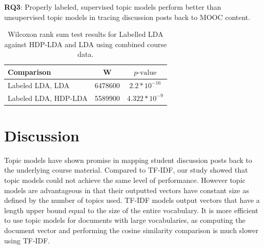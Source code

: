 \documentclass[sigconf, anonymous]{acmart}
\begin{document}
\begin{tcolorbox}[sharp corners, top=1mm, bottom=1mm]
\textbf{RQ3}: Properly labeled, supervised topic models perform better than unsupervised topic models in tracing discussion posts back to MOOC content.
\end{tcolorbox}

\begin{table}
    \centering
    \begin{tabular}{l*{2}{c}}
    \toprule
    Comparison & W & $p\text{-value}$ \\
    \midrule
    Labeled LDA, LDA & 6478600 & $2.2*10^{-16}$ \\
    Labeled LDA, HDP-LDA & 5589900 & $4.322*10^{-9}$ \\
    \bottomrule
    \end{tabular}
    \caption{Wilcoxon rank sum test results for Labelled LDA against HDP-LDA and LDA using combined course data.}
    \label{tab:sup-unsup-test}
\end{table}

\section{Discussion}
Topic models have shown promise in mapping student discussion posts back to the underlying course material.
Compared to TF-IDF, our study showed that topic models could not achieve the same level of performance.
However topic models are advantageous in that their outputted vectors have constant size as defined by the number of topics used.
TF-IDF models output vectors that have a length upper bound equal to the size of the entire vocabulary.
It is more efficient to use topic models for documents with large vocabularies, as computing the document vector and performing the cosine similarity comparison is much slower using TF-IDF.
\end{document}
